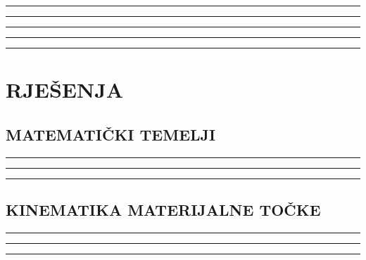 \documentclass[10pt]{book}
\newcounter{zadatak} %
\newcounter{cjelina}
\begin{document}

\noindent
{\color{boja} \rule{\linewidth}{0.3mm} }

\vspace{0.2cm}




\noindent
{\color{boja} \rule{\linewidth}{0.3mm} }





\noindent
{\color{boja} \rule{\linewidth}{0.3mm} }


\vspace{1cm}

\noindent
{\color{boja} \rule{\linewidth}{0.3mm} }


\vspace{1cm}

\noindent
{\color{boja} \rule{\linewidth}{0.3mm} }


\chapter{RJEŠENJA}
\section{MATEMATIČKI TEMELJI}


{\color{boja} \rule{\linewidth}{0.3mm} }



{\color{boja} \rule{\linewidth}{0.3mm} }




{\color{boja} \rule{\linewidth}{0.3mm} }


\setcounter{zadatak}{0}

\section{KINEMATIKA MATERIJALNE TOČKE}

{\color{boja} \rule{\linewidth}{0.3mm} }


{\color{boja} \rule{\linewidth}{0.3mm} }


{\color{boja} \rule{\linewidth}{0.3mm} }



\setcounter{zadatak}{0}






%

%

\end{document}
